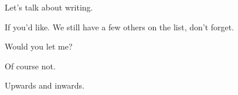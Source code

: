 \begin{paracol}{2}
  \begin{leftcolumn}

\noindent Let's talk about writing.

\begin{ally}
If you'd like. We still have a few others on the list, don't forget.
\end{ally}
Would you let me?

\begin{ally}
Of course not.
\end{ally}
Upwards and inwards.
\newpage

\end{leftcolumn}
\end{paracol}

